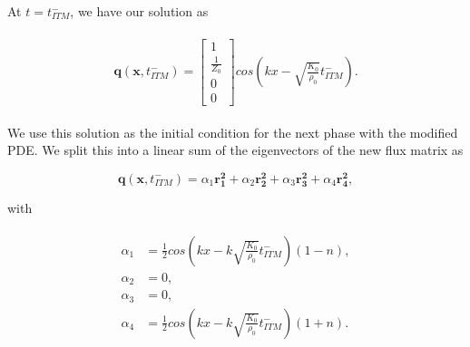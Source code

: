 At $t = t_{ITM}^-$, we have our solution as 

\begin{align}
    \begin{split}
        \mathbf{q}\left(\mathbf{x}, t_{ITM}^-\right) = \begin{bmatrix}
            1 \\
            \frac{1}{Z_0} \\
            0 \\
            0
            \end{bmatrix} cos\left(kx - \sqrt{\frac{K_{0}}{\rho_{0}}}t_{ITM}^-\right) .
    \end{split}
\end{align}

We use this solution as the initial condition for the next phase with the modified PDE. We split this into a linear sum of the eigenvectors of the new flux matrix
as 

\begin{equation}
    \mathbf{q}\left(\mathbf{x}, t_{ITM}^-\right) = \alpha_1 \mathbf{r_1^2} + \alpha_2 \mathbf{r_2^2} + \alpha_3 \mathbf{r_3^2} + \alpha_4 \mathbf{r_4^2},
\end{equation}

with 

\begin{align}
    \begin{split}
        \alpha_1 &= \frac{1}{2}cos\left(kx - k \sqrt{\frac{K_0}{\rho_0}} t_{ITM}^-\right) \left(1 - n\right), \\
        \alpha_2 &= 0, \\
        \alpha_3 &= 0, \\
        \alpha_4 &= \frac{1}{2}cos\left(kx - k \sqrt{\frac{K_0}{\rho_0}} t_{ITM}^-\right) \left(1 + n\right) .
    \end{split}
\end{align}

